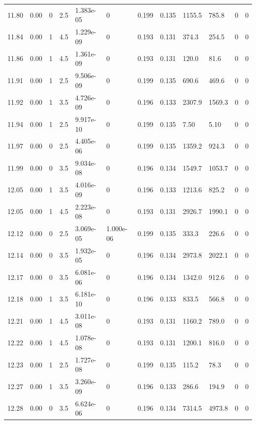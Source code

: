 \documentclass[preview]{standalone}
\begin{document}
{{{{{{{{{{{{\begin{tabular}{L{1.2cm}C{1.2cm} C{0.3cm}C{0.5cm} C{1.4cm}C{1.4cm} C{1.4cm}C{1.4cm} C{1.6cm}C{1.6cm} C{1.6cm}C{1.6cm}}
  11.80  &  0.00  & 0     & 2.5 &  1.383e-05  & 0  &  0.199&   0.135& 1155.5 & 785.8   &  0 & 0  \\ 
  11.84  &  0.00  & 1     & 4.5 &  1.229e-09  & 0  &  0.193&   0.131& 374.3 & 254.5   &  0 & 0  \\ 
  11.86  &  0.00  & 1     & 4.5 &  1.361e-09  & 0  &  0.193&   0.131& 120.0 & 81.6   &  0 & 0  \\ 
  11.91  &  0.00  & 1     & 2.5 &  9.506e-09  & 0  &  0.199&   0.135& 690.6 & 469.6   &  0 & 0  \\ 
  11.92  &  0.00  & 1     & 3.5 &  4.726e-09  & 0  &  0.196&   0.133& 2307.9 & 1569.3   &  0 & 0  \\ 
  11.94  &  0.00  & 1     & 2.5 &  9.917e-10  & 0  &  0.199&   0.135& 7.50 & 5.10   &  0 & 0  \\ 
  11.97  &  0.00  & 0     & 2.5 &  4.405e-06  & 0  &  0.199&   0.135& 1359.2 & 924.3   &  0 & 0  \\ 
  11.99  &  0.00  & 0     & 3.5 &  9.034e-08  & 0  &  0.196&   0.134& 1549.7 & 1053.7   &  0 & 0  \\ 
  12.05  &  0.00  & 1     & 3.5 &  4.016e-09  & 0  &  0.196&   0.133& 1213.6 & 825.2   &  0 & 0  \\ 
  12.05  &  0.00  & 1     & 4.5 &  2.223e-08  & 0  &  0.193&   0.131& 2926.7 & 1990.1   &  0 & 0  \\ 
  12.12  &  0.00  & 0     & 2.5 &  3.069e-05  & 1.000e-06  &  0.199&   0.135& 333.3 & 226.6   &  0 & 0  \\ 
  12.14  &  0.00  & 0     & 3.5 &  1.932e-05  & 0  &  0.196&   0.134& 2973.8 & 2022.1   &  0 & 0  \\ 
  12.17  &  0.00  & 0     & 3.5 &  6.081e-06  & 0  &  0.196&   0.134& 1342.0 & 912.6   &  0 & 0  \\ 
  12.18  &  0.00  & 1     & 3.5 &  6.181e-10  & 0  &  0.196&   0.133& 833.5 & 566.8   &  0 & 0  \\ 
  12.21  &  0.00  & 1     & 4.5 &  3.011e-08  & 0  &  0.193&   0.131& 1160.2 & 789.0   &  0 & 0  \\ 
  12.22  &  0.00  & 1     & 4.5 &  1.078e-08  & 0  &  0.193&   0.131& 1200.1 & 816.0   &  0 & 0  \\ 
  12.23  &  0.00  & 1     & 2.5 &  1.727e-08  & 0  &  0.199&   0.135& 115.2 & 78.3   &  0 & 0  \\ 
  12.27  &  0.00  & 1     & 3.5 &  3.260e-09  & 0  &  0.196&   0.133& 286.6 & 194.9   &  0 & 0  \\ 
  12.28  &  0.00  & 0     & 3.5 &  6.624e-06  & 0  &  0.196&   0.134& 7314.5 & 4973.8   &  0 & 0  \\ 

\end{tabular}}}}}}}}}}}}}
\end{document}
